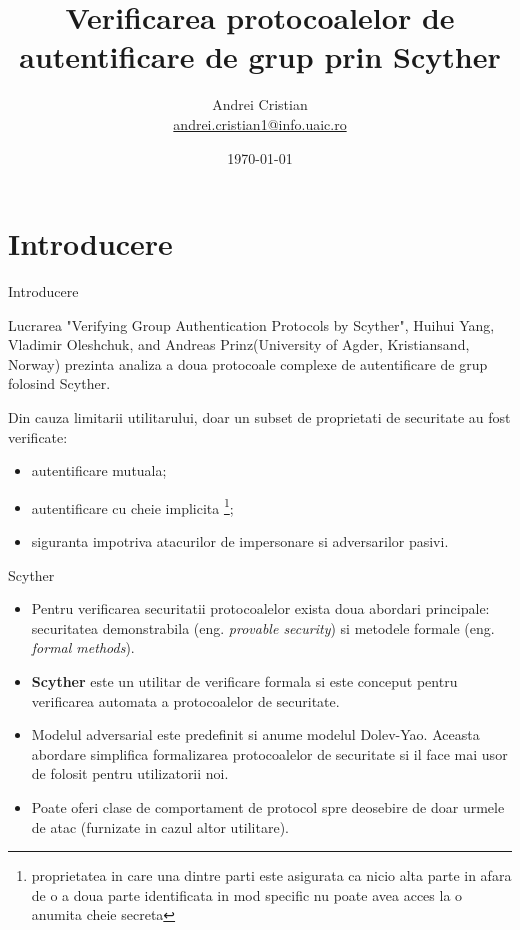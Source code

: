 \documentclass[11pt]{beamer}
\author{Andrei Cristian\\
\href{mailto:andrei.cristian1@info.uaic.ro}{andrei.cristian1@info.uaic.ro}}
\title{Verificarea protocoalelor de autentificare de grup prin Scyther}
\date{\today}
\begin{document}
\begin{frame}
\titlepage
\end{frame}

\begin{frame}
\tableofcontents
\end{frame}

\section{Introducere}

\begin{frame}{Introducere}

Lucrarea "Verifying Group Authentication Protocols by Scyther", Huihui Yang, Vladimir Oleshchuk, and Andreas Prinz(University of Agder, Kristiansand, Norway) prezinta analiza a doua protocoale complexe de autentificare de grup folosind Scyther.

Din cauza limitarii utilitarului, doar un subset de proprietati de securitate au fost verificate:
\begin{itemize}
\item autentificare mutuala;
\item autentificare cu cheie implicita \footnote{proprietatea in care una dintre parti este asigurata ca nicio alta parte in afara de o a doua parte identificata in mod specific nu poate avea acces la o anumita cheie secreta};
\item siguranta impotriva atacurilor de impersonare si adversarilor pasivi.
\end{itemize}

\end{frame}

\begin{frame}{Scyther}
\begin {itemize}
\item Pentru verificarea securitatii protocoalelor exista doua abordari principale: securitatea demonstrabila (eng. \textit{provable security}) si metodele formale (eng. \textit{formal methods}).
\item \textbf{Scyther} este un utilitar de verificare formala si este conceput pentru verificarea automata a protocoalelor de securitate.
\item Modelul adversarial este predefinit si anume modelul Dolev-Yao. Aceasta abordare simplifica formalizarea protocoalelor de securitate si il face mai usor de folosit pentru utilizatorii noi.
\item Poate oferi clase de comportament de protocol spre deosebire de doar urmele de atac (furnizate in cazul altor utilitare).

\end{itemize}
\end{frame}
\end{document}
